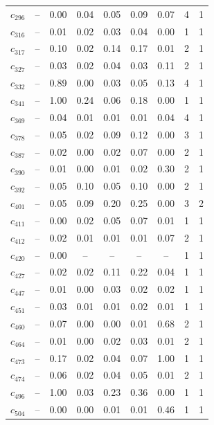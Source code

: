 \begin{tabular}{lcccccccc}
$c_{296}$ & -- & 0.00 & 0.04 & 0.05 & 0.09 & 0.07 & 4 & 1 \\
$c_{316}$ & -- & 0.01 & 0.02 & 0.03 & 0.04 & 0.00 & 1 & 1 \\
$c_{317}$ & -- & 0.10 & 0.02 & 0.14 & 0.17 & 0.01 & 2 & 1 \\
$c_{327}$ & -- & 0.03 & 0.02 & 0.04 & 0.03 & 0.11 & 2 & 1 \\
$c_{332}$ & -- & 0.89 & 0.00 & 0.03 & 0.05 & 0.13 & 4 & 1 \\
$c_{341}$ & -- & 1.00 & 0.24 & 0.06 & 0.18 & 0.00 & 1 & 1 \\
$c_{369}$ & -- & 0.04 & 0.01 & 0.01 & 0.01 & 0.04 & 4 & 1 \\
$c_{378}$ & -- & 0.05 & 0.02 & 0.09 & 0.12 & 0.00 & 3 & 1 \\
$c_{387}$ & -- & 0.02 & 0.00 & 0.02 & 0.07 & 0.00 & 2 & 1 \\
$c_{390}$ & -- & 0.01 & 0.00 & 0.01 & 0.02 & 0.30 & 2 & 1 \\
$c_{392}$ & -- & 0.05 & 0.10 & 0.05 & 0.10 & 0.00 & 2 & 1 \\
$c_{401}$ & -- & 0.05 & 0.09 & 0.20 & 0.25 & 0.00 & 3 & 2 \\
$c_{411}$ & -- & 0.00 & 0.02 & 0.05 & 0.07 & 0.01 & 1 & 1 \\
$c_{412}$ & -- & 0.02 & 0.01 & 0.01 & 0.01 & 0.07 & 2 & 1 \\
$c_{420}$ & -- & 0.00 & -- & -- & -- & -- & 1 & 1 \\
$c_{427}$ & -- & 0.02 & 0.02 & 0.11 & 0.22 & 0.04 & 1 & 1 \\
$c_{447}$ & -- & 0.01 & 0.00 & 0.03 & 0.02 & 0.02 & 1 & 1 \\
$c_{451}$ & -- & 0.03 & 0.01 & 0.01 & 0.02 & 0.01 & 1 & 1 \\
$c_{460}$ & -- & 0.07 & 0.00 & 0.00 & 0.01 & 0.68 & 2 & 1 \\
$c_{464}$ & -- & 0.01 & 0.00 & 0.02 & 0.03 & 0.01 & 2 & 1 \\
$c_{473}$ & -- & 0.17 & 0.02 & 0.04 & 0.07 & 1.00 & 1 & 1 \\
$c_{474}$ & -- & 0.06 & 0.02 & 0.04 & 0.05 & 0.01 & 2 & 1 \\
$c_{496}$ & -- & 1.00 & 0.03 & 0.23 & 0.36 & 0.00 & 1 & 1 \\
$c_{504}$ & -- & 0.00 & 0.00 & 0.01 & 0.01 & 0.46 & 1 & 1 \\
\bottomrule
\end{tabular}
